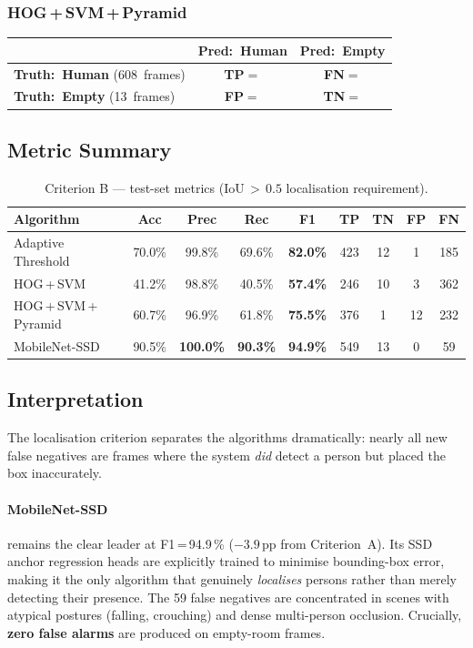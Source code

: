 \documentclass[11pt, a4paper]{article}
\newcommand{\confmat}[6]{%
    \def\cmTP{#1}\def\cmFN{#2}\def\cmFP{#3}\def\cmTN{#4}%
    \def\cmPos{#5}\def\cmNeg{#6}%
    \vspace{4pt}
    \begin{center}
    \renewcommand{\arraystretch}{1.8}%
    \begin{tabular}{lcc}
        \hline
        \rule{0pt}{2.4ex}%
        & \textbf{Pred:\ Human} & \textbf{Pred:\ Empty} \\[2pt]
        \hline
        \rule{0pt}{2.6ex}%
        \textbf{Truth:\ Human} (\cmPos\ frames)
            & \cellcolor{cellgreenlight}\textcolor{tpgreen}{\textbf{TP}}\;$=$\;\cmTP
            & \cellcolor{cellyellowlight}\textcolor{fnyellow}{\textbf{FN}}\;$=$\;\cmFN \\[4pt]
        \textbf{Truth:\ Empty} (\cmNeg\ frames)
            & \cellcolor{cellredlight}\textcolor{fpred}{\textbf{FP}}\;$=$\;\cmFP
            & \cellcolor{cellbluelight}\textcolor{tnblue}{\textbf{TN}}\;$=$\;\cmTN \\[2pt]
        \hline
    \end{tabular}
    \end{center}
    \vspace{4pt}
}
\begin{document}
\subsubsection*{HOG\,+\,SVM\,+\,Pyramid}
\confmat{376}{232}{12}{1}{608}{13}

\subsection{Metric Summary}

\begin{table}[H]
\centering
\caption{Criterion B — test-set metrics (IoU\,$>\,0.5$ localisation requirement).}
\renewcommand{\arraystretch}{1.3}
\begin{tabular}{lcccccccc}
\toprule
\textbf{Algorithm}
    & \textbf{Acc} & \textbf{Prec} & \textbf{Rec} & \textbf{F1}
    & \textbf{TP}  & \textbf{TN}   & \textbf{FP}  & \textbf{FN} \\
\midrule
Adaptive Threshold
    & 70.0\% & 99.8\%          & 69.6\% & \textbf{82.0\%}
    & 423    & 12 &  1 & 185 \\
HOG\,+\,SVM
    & 41.2\% & 98.8\%          & 40.5\% & \textbf{57.4\%}
    & 246    & 10 &  3 & 362 \\
HOG\,+\,SVM\,+\,Pyramid
    & 60.7\% & 96.9\%          & 61.8\% & \textbf{75.5\%}
    & 376    &  1 & 12 & 232 \\
MobileNet-SSD
    & 90.5\% & \textbf{100.0\%}& \textbf{90.3\%} & \textbf{94.9\%}
    & 549    & 13 &  0 &  59 \\
\bottomrule
\end{tabular}
\label{tab:crB}
\end{table}

\subsection{Interpretation}

The localisation criterion separates the algorithms dramatically: nearly all new false
negatives are frames where the system \emph{did} detect a person but placed the box
inaccurately.

\paragraph{MobileNet-SSD} remains the clear leader at F1\,=\,94.9\,\%
($-3.9$\,pp from Criterion~A).  Its SSD anchor regression heads are explicitly trained
to minimise bounding-box error, making it the only algorithm that genuinely
\emph{localises} persons rather than merely detecting their presence.  The 59 false
negatives are concentrated in scenes with atypical postures (falling, crouching) and
dense multi-person occlusion.  Crucially, \textbf{zero false alarms} are produced on
empty-room frames.
\end{document}
